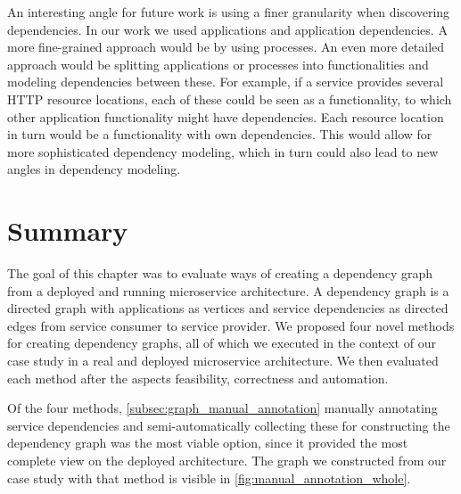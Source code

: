 An interesting angle for future work is using a finer granularity when discovering dependencies. In our work we used applications and application dependencies. A more fine-grained approach would be by using processes. An even more detailed approach would be splitting applications or processes into functionalities and modeling dependencies between these. For example, if a service provides several HTTP resource locations, each of these could be seen as a functionality, to which other application functionality might have dependencies. Each resource location in turn would be a functionality with own dependencies. This would allow for more sophisticated dependency modeling, which in turn could also lead to new angles in dependency modeling.

\section{Summary}

The goal of this chapter was to evaluate ways of creating a dependency graph from a deployed and running microservice architecture. A dependency graph is a directed graph with applications as vertices and service dependencies as directed edges from service consumer to service provider. We proposed four novel methods for creating dependency graphs, all of which we executed in the context of our case study in a real and deployed microservice architecture. We then evaluated each method after the aspects feasibility, correctness and automation.

Of the four methods, \ref{subsec:graph_manual_annotation} manually annotating service dependencies and semi-automatically collecting these for constructing the dependency graph was the most viable option, since it provided the most complete view on the deployed architecture. The graph we constructed from our case study with that method is visible in \autoref{fig:manual_annotation_whole}.

%
